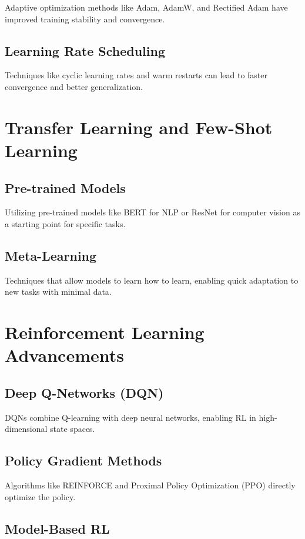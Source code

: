 Adaptive optimization methods like Adam, AdamW, and Rectified Adam have
improved training stability and convergence.

\subsection{Learning Rate Scheduling}

Techniques like cyclic learning rates and warm restarts can lead to
faster convergence and better generalization.

\section{Transfer Learning and Few-Shot Learning}

\subsection{Pre-trained Models}

Utilizing pre-trained models like BERT for NLP or ResNet for computer
vision as a starting point for specific tasks.

\subsection{Meta-Learning}

Techniques that allow models to learn how to learn, enabling quick
adaptation to new tasks with minimal data.

\section{Reinforcement Learning Advancements}

\subsection{Deep Q-Networks (DQN)}

DQNs combine Q-learning with deep neural networks, enabling RL in
high-dimensional state spaces.

\subsection{Policy Gradient Methods}

Algorithms like REINFORCE and Proximal Policy Optimization (PPO)
directly optimize the policy.

\subsection{Model-Based RL}

